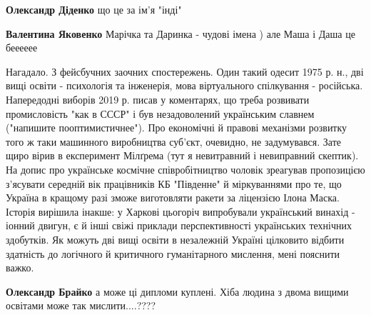 \begin{itemize}
\begin{itemize}
\textbf{Олександр Діденко} що це за ім'я "інді" 🤦

 
\textbf{Валентина Яковенко} Марічка та Даринка - чудові імена ) але Маша і Даша це бееееее 🥴
\end{itemize}


Нагадало. З фейсбучних заочних спостережень. Один такий одесит 1975 р. н., дві
вищі освіти - психологія та інженерія, мова віртуального спілкування -
російська. Напередодні виборів 2019 р. писав у коментарях, що треба розвивати
промисловість "как в СССР" і був незадоволений українським славнем ("напишите
пооптимистичнее"). Про економічні й правові механізми розвитку того ж таки
машинного виробництва суб'єкт, очевидно, не задумувався. Зате щиро вірив в
експеримент Мілґрема (тут я невитравний і невиправний скептик). На допис про
українське космічне співробітництво чоловік зреагував пропозицією з'ясувати
середній вік працівників КБ "Південне" й міркуваннями про те, що Україна в
кращому разі зможе виготовляти ракети за ліцензією Ілона Маска. Історія
вирішила інакше: у Харкові цьогоріч випробували український винахід - іонний
двигун, є й інші свіжі приклади перспективності українських технічних
здобутків. Як можуть дві вищі освіти в незалежній Україні цілковито відбити
здатність до логічного й критичного гуманітарного мислення, мені пояснити
важко.

\begin{itemize}
 
\textbf{Олександр Брайко} а може ці дипломи куплені. Хіба людина з двома вищими освітами може так мислити....????

 

\end{itemize}
\end{itemize}
